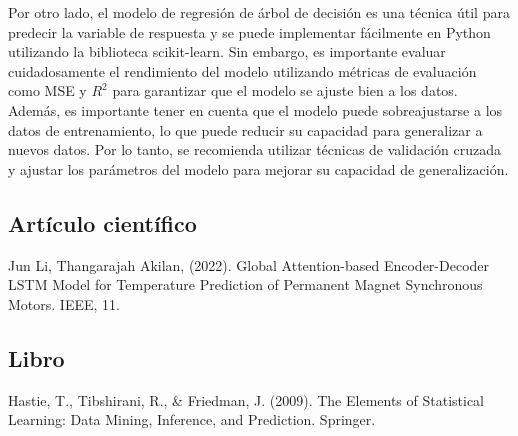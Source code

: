 \documentclass{article}
\begin{document}
Por otro lado, el modelo de regresión de árbol de decisión es una técnica útil para predecir la variable de respuesta y se puede implementar fácilmente en Python utilizando la biblioteca scikit-learn. Sin embargo, es importante evaluar cuidadosamente el rendimiento del modelo utilizando métricas de evaluación como MSE y $R^2$ para garantizar que el modelo se ajuste bien a los datos. Además, es importante tener en cuenta que el modelo puede sobreajustarse a los datos de entrenamiento, lo que puede reducir su capacidad para generalizar a nuevos datos. Por lo tanto, se recomienda utilizar técnicas de validación cruzada y ajustar los parámetros del modelo para mejorar su capacidad de generalización.
\pagebreak







\subsection{Artículo científico}

 Jun Li, Thangarajah Akilan, (2022). Global Attention-based Encoder-Decoder LSTM Model for Temperature Prediction of Permanent Magnet Synchronous Motors. IEEE, 11.

\subsection{Libro}

 Hastie, T., Tibshirani, R., & Friedman, J. (2009). The Elements of Statistical Learning: Data Mining, Inference, and Prediction. Springer.
\end{document}
